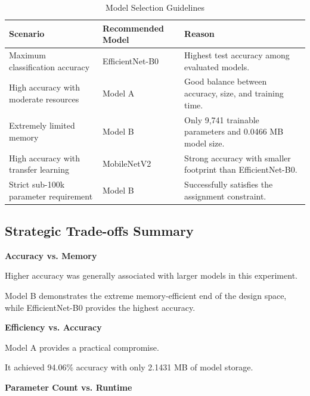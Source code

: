 \documentclass[12pt,a4paper]{report}
\begin{document}
\begin{table}[H]
\centering
\caption{Model Selection Guidelines}
\label{tab:model-selection}

\begin{tabularx}{\textwidth}{p{4cm}p{3.5cm}X}
\toprule
\textbf{Scenario}
&
\textbf{Recommended Model}
&
\textbf{Reason}
\\
\midrule

Maximum classification accuracy
&
EfficientNet-B0
&
Highest test accuracy among evaluated models.
\\

High accuracy with moderate resources
&
Model A
&
Good balance between accuracy, size, and training time.
\\

Extremely limited memory
&
Model B
&
Only 9,741 trainable parameters and 0.0466 MB model size.
\\

High accuracy with transfer learning
&
MobileNetV2
&
Strong accuracy with smaller footprint than EfficientNet-B0.
\\

Strict sub-100k parameter requirement
&
Model B
&
Successfully satisfies the assignment constraint.
\\

\bottomrule
\end{tabularx}

\end{table}
\newpage
\subsection{Strategic Trade-offs Summary}

\textbf{Accuracy vs. Memory}

Higher accuracy was generally associated with larger models in
this experiment.

Model B demonstrates the extreme memory-efficient end of the
design space, while EfficientNet-B0 provides the highest accuracy.

\textbf{Efficiency vs. Accuracy}

Model A provides a practical compromise.

It achieved 94.06\% accuracy with only 2.1431 MB of model storage.

\textbf{Parameter Count vs. Runtime}
\end{document}
